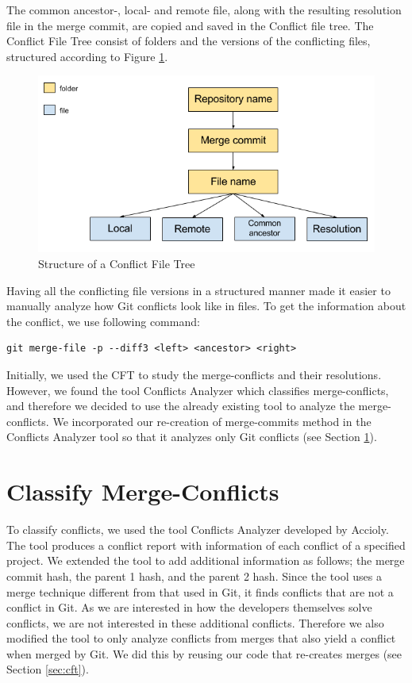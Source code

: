 The common ancestor-, local- and remote file, along with the resulting resolution file in the merge commit, are copied and saved in the Conflict file tree. The Conflict File Tree consist of folders and the versions of the conflicting files, structured according to Figure \ref{fig:cft}.\\
\begin{figure}[H]
\centering
\includegraphics[width=400pt]{figure/conflicts.png}
\caption{Structure of a Conflict File Tree}\label{fig:cft}
\end{figure}

Having all the conflicting file versions in a structured manner made it easier to manually analyze how Git conflicts look like in files. To get the information about the conflict, we use following command:
\lstset{language=Bash,numbers=left,xleftmargin=2em,frame=single,framexleftmargin=1.5em}
\begin{lstlisting}[frame=single,breaklines=true,tabsize=2]
git merge-file -p --diff3 <left> <ancestor> <right>
\end{lstlisting}
Initially, we used the CFT to study the merge-conflicts and their resolutions. However, we found the tool Conflicts Analyzer which classifies merge-conflicts, and therefore we decided to use the already existing tool to analyze the merge-conflicts. We incorporated our re-creation of merge-commits method in the Conflicts Analyzer tool so that it analyzes only Git conflicts (see Section \ref{sec:cmc}).

\section{Classify Merge-Conflicts}\label{sec:cmc}
To classify conflicts, we used the tool Conflicts Analyzer developed by Accioly. The tool produces a conflict report with information of each conflict of a specified project. We extended the tool to add additional information as follows; the merge commit hash, the parent 1 hash, and the parent 2 hash. Since the tool uses a merge technique different from that used in Git, it finds conflicts that are not a conflict in Git. As we are interested in how the developers themselves solve conflicts, we are not interested in these additional conflicts. Therefore we also modified the tool to only analyze conflicts from merges that also yield a conflict when merged by Git. We did this by reusing our code that re-creates merges (see Section \ref{sec:cft}).

